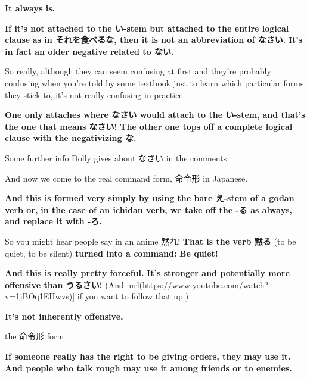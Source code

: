 {}

{\bf It always is.}

\thinrule

{\bf If it's not attached to the い-stem but attached to the entire logical clause} {\bf as in それを食べるな, then it is not an abbreviation of なさい.} {\bf It's in fact an older negative related to ない.}

{}

So really, although they can seem confusing at first and they're probably confusing when you're told by some textbook just to learn which particular forms they stick to, it's not really confusing in practice.

{\bf One only attaches where なさい would attach to the い-stem,} {\bf and that's the one that means なさい!} {\bf The other one tops off a complete logical clause with the negativizing な.}

Some further info Dolly gives about なさい in the comments

{}

\stopsectionlevel

\stopsectionlevel

\startsectionlevel[title={The real command / imperative form - 命令形},reference={the-real-command-imperative-form---命令形}]

And now we come to the real command form, 命令形 in Japanese.

{}

{\bf And this is formed very simply by using the bare え-stem of a godan verb or,} {\bf in the case of an ichidan verb, we take off the -る as always, and replace it with -ろ.}

So you might hear people say in an anime 黙れ! {\bf That is the verb 黙る} (to be quiet, to be silent) {\bf turned into a command:} {\bf Be quiet!}

{\bf And this is really pretty forceful.} {\bf It's stronger and potentially more offensive than うるさい!} (And [url(https://www.youtube.com/watch?v=1jBOq1EHwvs)] if you want to follow that up.)

{\bf It's not inherently offensive,}

the 命令形 form

{\bf If someone really has the right to be giving orders, they may use it.} {\bf And people who talk rough may use it among friends or to enemies.}

